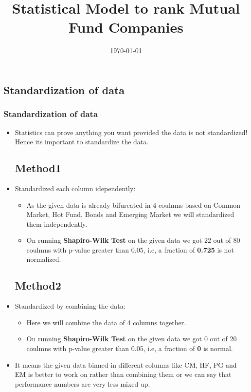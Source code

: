 \documentclass[pdf]{beamer}
\title{Statistical Model to rank Mutual Fund Companies}
\date{\today}
\begin{document}
\begin{frame}
	\titlepage
\end{frame}

\begin{frame}
	\tableofcontents
\end{frame}

\begin{frame}
	\section{Standardization of data}
	\frametitle{Standardization of data}
	\begin{itemize} 
		\item Statistics can prove anything you want provided the data is not standardized! Hence its important to standardize the data.
		\subsection{Method1}
		\item Standardized each column idependently:
		\begin{itemize}
			\item As the given data is already bifurcated in 4 coulmns based on Common Market, Hot Fund, Bonds and Emerging Market we will standardized them independently.
			\item On running \textbf{Shapiro-Wilk Test} on the given data we got 22 out of 80 coulmns with p-value greater than 0.05, i.e, a fraction of \textbf{0.725} is not normalized.
		\end{itemize}
		\subsection{Method2}
		\item Standardized by combining the data:
		\begin{itemize}
			\item Here we will combine the data of 4 columns together.
			\item On running \textbf{Shapiro-Wilk Test} on the given data we got 0 out of 20 coulmns with p-value greater than 0.05, i.e, a fraction of \textbf{0} is normal.
		\end{itemize}
		\item It means the given data binned in different columns like CM, HF, PG and EM is better to work on rather than combining them or we can say that performance numbers are very less mixed up.
	\end{itemize}
\end{frame}
\end{document}
